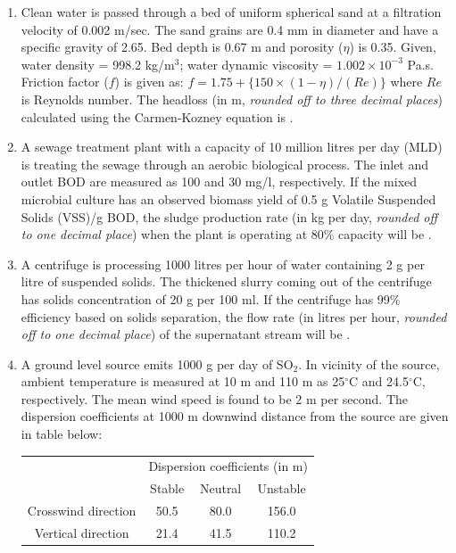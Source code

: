 \documentclass[12pt,a4paper]{article}
\begin{document}
\begin{enumerate}
   \item Clean water is passed through a bed of uniform spherical sand at a filtration velocity of 0.002 m/sec. The sand grains are 0.4 mm in diameter and have a specific gravity of 2.65. Bed depth is 0.67 m and porosity ($\eta$) is 0.35. Given, water density = 998.2 kg/m$^3$; water dynamic viscosity = $1.002 \times 10^{-3}$ Pa.s. Friction factor ($f$) is given as: $f = 1.75 + \{150 \times (1-\eta)/(Re)\}$ where $Re$ is Reynolds number. The headloss (in m, \textit{rounded off to three decimal places}) calculated using the Carmen-Kozney equation is \underline{\hspace{2cm}}.

   \item A sewage treatment plant with a capacity of 10 million litres per day (MLD) is treating the sewage through an aerobic biological process. The inlet and outlet BOD are measured as 100 and 30 mg/l, respectively. If the mixed microbial culture has an observed biomass yield of 0.5 g Volatile Suspended Solids (VSS)/g BOD, the sludge production rate (in kg per day, \textit{rounded off to one decimal place}) when the plant is operating at 80\% capacity will be \underline{\hspace{2cm}}.

   \item A centrifuge is processing 1000 litres per hour of water containing 2 g per litre of suspended solids. The thickened slurry coming out of the centrifuge has solids concentration of 20 g per 100 ml. If the centrifuge has 99\% efficiency based on solids separation, the flow rate (in litres per hour, \textit{rounded off to one decimal place}) of the supernatant stream will be \underline{\hspace{2cm}}.

   \item A ground level source emits 1000 g per day of SO$_2$. In vicinity of the source, ambient temperature is measured at 10 m and 110 m as 25$^\circ$C and 24.5$^\circ$C, respectively. The mean wind speed is found to be 2 m per second. The dispersion coefficients at 1000 m downwind distance from the source are given in table below:

   \begin{table}[H]
      \centering
      \begin{tabular}{|c|c|c|c|}
         \hline
         \multirow{2}{*}{} & \multicolumn{3}{c|}{Dispersion coefficients (in m)} \\
         \cline{2-4}
         & Stable & Neutral & Unstable \\\hline
         Crosswind direction & 50.5 & 80.0 & 156.0 \\\hline
         Vertical direction  & 21.4 & 41.5 & 110.2 \\\hline
      \end{tabular}
      \label{tab:dispersion}
   \end{table}


\end{enumerate}
\end{document}
